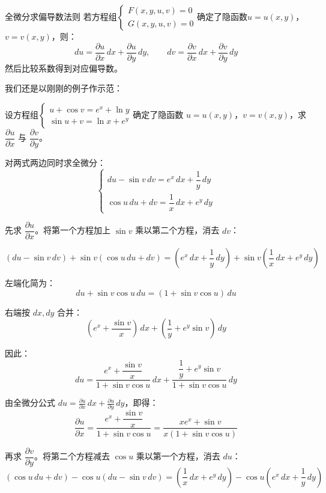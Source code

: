\begin{theorem}{全微分求偏导数法则}{}
  若方程组$\begin{cases}
F(x,y,u,v)=0 \\
G(x,y,u,v)=0
\end{cases}$确定了隐函数$u = u(x,y)$，$v = v(x,y)$，则：
\[
du = \frac{\partial u}{\partial x}\,dx + \frac{\partial u}{\partial y}\,dy,\qquad
dv = \frac{\partial v}{\partial x}\,dx + \frac{\partial v}{\partial y}\,dy
\]
然后比较系数得到对应偏导数。
\end{theorem}

我们还是以刚刚的例子作示范：

\begin{myexample}
  设方程组$\begin{cases}
u +\cos v=e^x+\ln y\\
\sin u +v=\ln x+e^y
\end{cases}$确定了隐函数 $u = u(x,y)$，$v = v(x,y)$，求 $\dfrac{\partial u}{\partial x}$ 与 $\dfrac{\partial v}{\partial y}$。

对两式两边同时求全微分：
\[
\begin{cases}
du - \sin v\,dv = e^x\,dx + \dfrac{1}{y}\,dy\\[6pt]
\cos u\,du + dv = \dfrac{1}{x}\,dx + e^y\,dy
\end{cases}
\]

先求 $\dfrac{\partial u}{\partial x}$。将第一个方程加上 $\sin v$ 乘以第二个方程，消去 $dv$：

\[
(du - \sin v\,dv) + \sin v(\cos u\,du + dv)
= (e^x\,dx + \frac{1}{y}\,dy) + \sin v(\frac{1}{x}\,dx + e^y\,dy)
\]

左端化简为：
\[
du + \sin v \cos u\,du = (1 + \sin v\cos u)\,du
\]

右端按 $dx,dy$ 合并：
\[
(e^x + \frac{\sin v}{x})\,dx + (\frac{1}{y} + e^y\sin v)\,dy
\]

因此：
\[
du = \frac{e^x + \dfrac{\sin v}{x}}{1 + \sin v\cos u}\,dx
    + \frac{\dfrac{1}{y} + e^y\sin v}{1 + \sin v\cos u}\,dy
\]

由全微分公式 $du = \frac{\partial u}{\partial x}\,dx + \frac{\partial u}{\partial y}\,dy$，即得：
\[
\frac{\partial u}{\partial x} = \frac{e^x + \dfrac{\sin v}{x}}{1 + \sin v\cos u}
      = \frac{x e^x + \sin v}{x(1 + \sin v\cos u)}
\]

再求 $\dfrac{\partial v}{\partial y}$。将第二个方程减去 $\cos u$ 乘以第一个方程，消去 $du$：
\[
(\cos u\,du + dv) - \cos u(du - \sin v\,dv)
= (\frac{1}{x}\,dx + e^y\,dy) - \cos u(e^x\,dx + \frac{1}{y}\,dy)
\]


\end{myexample}

